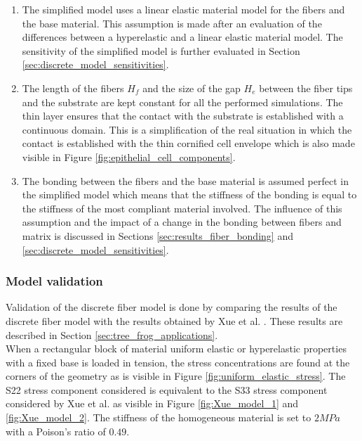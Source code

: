 \begin{enumerate}
    \item The simplified model uses a linear elastic material model for the fibers and the base material. This assumption is made after an evaluation of the differences between a hyperelastic and a linear elastic material model. The sensitivity of the simplified model is further evaluated in Section \ref{sec:discrete_model_sensitivities}.
    \item The length of the fibers $H_f$ and the size of the gap $H_e$ between the fiber tips and the substrate are kept constant for all the performed simulations. The thin layer ensures that the contact with the substrate is established with a continuous domain. This is a simplification of the real situation in which the contact is established with the thin cornified cell envelope which is also made visible in Figure \ref{fig:epithelial_cell_components}.
    \item The bonding between the fibers and the base material is assumed perfect in the simplified model which means that the stiffness of the bonding is equal to the stiffness of the most compliant material involved. The influence of this assumption and the impact of a change in the bonding between fibers and matrix is discussed in Sections \ref{sec:results_fiber_bonding} and \ref{sec:discrete_model_sensitivities}.
\end{enumerate}



\subsubsection{Model validation}\label{sec:discrete_model_validation}
Validation of the discrete fiber model is done by comparing the results of the discrete fiber model with the results obtained by Xue et al. \cite{xue2017hybrid}. These results are described in Section \ref{sec:tree_frog_applications}.\\

\qquad When a rectangular block of material uniform elastic or hyperelastic properties with a fixed base is loaded in tension, the stress concentrations are found at the corners of the geometry as is visible in Figure \ref{fig:uniform_elastic_stress}. The S22 stress component considered is equivalent to the S33 stress component considered by Xue et al. as visible in Figure \ref{fig:Xue_model_1} and \ref{fig:Xue_model_2}. The stiffness of the homogeneous material is set to $2 MPa$ with a Poison's ratio of $0.49$.\\

